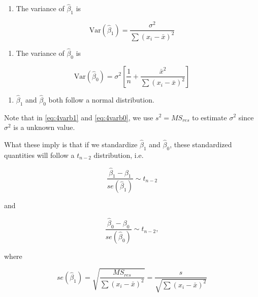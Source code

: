 \documentclass[
]{book}
\providecommand{\tightlist}{%
  \setlength{\itemsep}{0pt}\setlength{\parskip}{0pt}}
\begin{document}
\begin{enumerate}
\def\labelenumi{\arabic{enumi}.}
\setcounter{enumi}{1}
\tightlist
\item
  The variance of \(\hat{\beta}_1\) is
\end{enumerate}

\begin{equation} 
\mbox{Var}(\hat{\beta}_1) = \frac{\sigma^{2}}{\sum{(x_{i}-\bar{x})^{2}}}
\label{eq:4varb1}
\end{equation}

\begin{enumerate}
\def\labelenumi{\arabic{enumi}.}
\setcounter{enumi}{2}
\tightlist
\item
  The variance of \(\hat{\beta}_0\) is
\end{enumerate}

\begin{equation} 
\mbox{Var}(\hat{\beta}_0) = \sigma^2 \left[\frac{1}{n} + \frac{\bar{x}^2}{\sum (x_i -\bar{x})^2}\right]
\label{eq:4varb0}
\end{equation}

\begin{enumerate}
\def\labelenumi{\arabic{enumi}.}
\setcounter{enumi}{3}
\tightlist
\item
  \(\hat{\beta}_1\) and \(\hat{\beta}_0\) both follow a normal distribution.
\end{enumerate}

Note that in \eqref{eq:4varb1} and \eqref{eq:4varb0}, we use \(s^2 = MS_{res}\) to estimate \(\sigma^2\) since \(\sigma^2\) is a unknown value.

What these imply is that if we standardize \(\hat{\beta}_1\) and \(\hat{\beta}_0\), these standardized quantities will follow a \(t_{n-2}\) distribution, i.e.

\begin{equation} 
\frac{\hat{\beta}_1 - \beta_1}{se(\hat{\beta}_1)}\sim t_{n-2}
\label{eq:distb1}
\end{equation}

and

\begin{equation} 
\frac{\hat{\beta}_0 - \beta_0}{se(\hat{\beta}_0)}\sim t_{n-2},
\label{eq:distb0}
\end{equation}

where

\begin{equation}
se(\hat{\beta}_1) = \sqrt{\frac{MS_{res}}{\sum{(x_{i}-\bar{x})^{2}}}} = \frac{s}{\sqrt{\sum{(x_{i}-\bar{x})^{2}}}}
\label{eq:seb1}
\end{equation}
\end{document}
